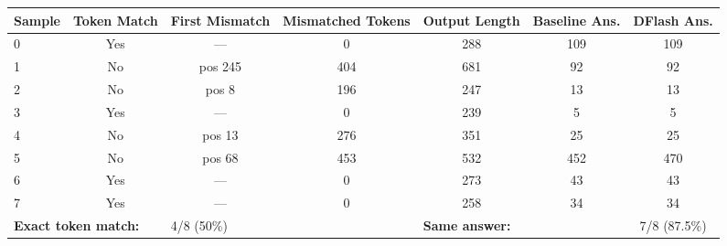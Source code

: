 \centering
\begin{tabular}{l|cccccc}
\toprule
Sample & Token Match & First Mismatch & Mismatched Tokens & Output Length & Baseline Ans. & DFlash Ans. \\
\midrule
0 & Yes & --- & 0 & 288 & 109 & 109 \\
1 & No & pos 245 & 404 & 681 & 92 & 92 \\
2 & No & pos 8 & 196 & 247 & 13 & 13 \\
3 & Yes & --- & 0 & 239 & 5 & 5 \\
4 & No & pos 13 & 276 & 351 & 25 & 25 \\
5 & No & pos 68 & 453 & 532 & 452 & 470 \\
6 & Yes & --- & 0 & 273 & 43 & 43 \\
7 & Yes & --- & 0 & 258 & 34 & 34 \\
\midrule
\multicolumn{2}{l}{\textbf{Exact token match:}} & \multicolumn{2}{l}{4/8 (50\%)} & \multicolumn{2}{l}{\textbf{Same answer:}} & 7/8 (87.5\%) \\
\bottomrule
\end{tabular}
